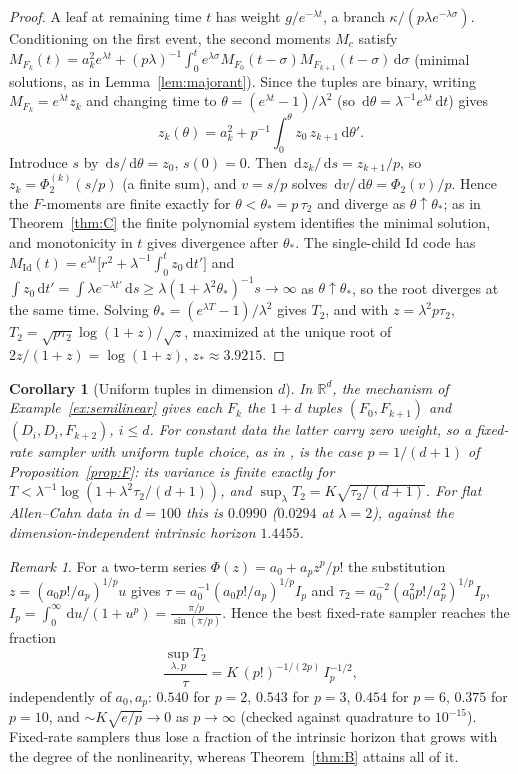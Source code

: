 \documentclass[11pt]{article}
\newtheorem{corollary}[theorem]{Corollary}
\theoremstyle{definition}
\theoremstyle{remark}
\newtheorem{remark}[theorem]{Remark}
\newcommand{\R}{\mathbb{R}}
\newcommand{\Id}{\mathrm{Id}}
\newcommand{\dd}{\,\mathrm{d}}
\begin{document}
\begin{proof}
A leaf at remaining time $t$ has weight $g/e^{-\lambda t}$, a branch
$\kappa/(p\lambda e^{-\lambda\sigma})$. Conditioning on the first event,
the second moments $M_c$ satisfy
$M_{F_k}(t)=a_k^2e^{\lambda t}+(p\lambda)^{-1}\int_0^te^{\lambda\sigma}
M_{F_0}(t-\sigma)M_{F_{k+1}}(t-\sigma)\dd\sigma$ (minimal solutions, as in
Lemma~\ref{lem:majorant}). Since the tuples are binary, writing
$M_{F_k}=e^{\lambda t}z_k$ and changing time to
$\theta=(e^{\lambda t}-1)/\lambda^2$ (so $\dd\theta=\lambda^{-1}e^{\lambda
t}\dd t$) gives
\[
z_k(\theta)=a_k^2+p^{-1}\int_0^\theta z_0\,z_{k+1}\dd\theta'.
\]
Introduce $s$ by $\dd s/\dd\theta=z_0$, $s(0)=0$. Then
$\dd z_k/\dd s=z_{k+1}/p$, so $z_k=\Phi_2^{(k)}(s/p)$ (a finite sum), and
$v=s/p$ solves $\dd v/\dd\theta=\Phi_2(v)/p$. Hence the $F$-moments are
finite exactly for $\theta<\theta_*=p\,\tau_2$ and diverge as
$\theta\uparrow\theta_*$; as in Theorem~\ref{thm:C} the finite polynomial
system identifies the minimal solution, and monotonicity in $t$ gives
divergence after $\theta_*$. The single-child $\Id$ code has
$M_\Id(t)=e^{\lambda t}\big[r^2+\lambda^{-1}\int_0^tz_0\dd t'\big]$ and
$\int z_0\dd t'=\int\lambda e^{-\lambda t'}\dd s\ge
\lambda(1+\lambda^2\theta_*)^{-1}s\to\infty$ as $\theta\uparrow\theta_*$,
so the root diverges at the same time. Solving
$\theta_*=(e^{\lambda T}-1)/\lambda^2$ gives $T_2$, and with
$z=\lambda^2p\tau_2$, $T_2=\sqrt{p\tau_2}\log(1+z)/\sqrt z$, maximized
at the unique root of $2z/(1+z)=\log(1+z)$, $z_*\approx3.9215$.
\end{proof}

\begin{corollary}[Uniform tuples in dimension $d$]\label{cor:uniform}
In $\R^d$, the mechanism of Example~\ref{ex:semilinear} gives each $F_k$
the $1+d$ tuples $(F_0,F_{k+1})$ and $(D_i,D_i,F_{k+2})$, $i\le d$. For
constant data the latter carry zero weight, so a fixed-rate sampler with
uniform tuple choice, as in \cite{NPP23,NPP24}, is the case
$p=1/(d+1)$ of Proposition~\ref{prop:F}: its variance is finite exactly for
$T<\lambda^{-1}\log(1+\lambda^2\tau_2/(d+1))$, and
$\sup_\lambda T_2=K\sqrt{\tau_2/(d+1)}$. For flat Allen--Cahn data in
$d=100$ this is $0.0990$ ($0.0294$ at $\lambda=2$), against the
dimension-independent intrinsic horizon $1.4455$.
\end{corollary}

\begin{remark}\label{rem:fraction}
For a two-term series $\Phi(z)=a_0+a_pz^p/p!$ the substitution
$z=(a_0p!/a_p)^{1/p}u$ gives $\tau=a_0^{-1}(a_0p!/a_p)^{1/p}I_p$ and
$\tau_2=a_0^{-2}(a_0^2p!/a_p^2)^{1/p}I_p$, $I_p=\int_0^\infty\dd u/(1+u^p)
=\frac{\pi/p}{\sin(\pi/p)}$. Hence the best fixed-rate sampler reaches the
fraction
\[
\frac{\sup_{\lambda,p}T_2}{\tau}=K\,(p!)^{-1/(2p)}\,I_p^{-1/2},
\]
independently of $a_0,a_p$: $0.540$ for $p=2$, $0.543$ for $p=3$, $0.454$
for $p=6$, $0.375$ for $p=10$, and $\sim K\sqrt{e/p}\to0$ as $p\to\infty$
(checked against quadrature to $10^{-15}$). Fixed-rate samplers thus lose
a fraction of the intrinsic horizon that grows with the degree of the
nonlinearity, whereas Theorem~\ref{thm:B} attains all of it.
\end{remark}
\end{document}
